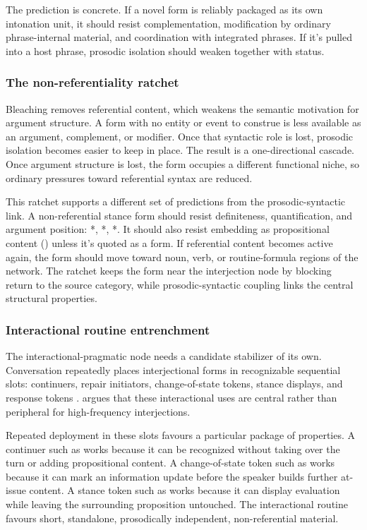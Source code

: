 \documentclass[12pt]{article}
\begin{document}
The prediction is concrete. If a novel form is reliably
packaged as its own intonation unit, it should resist complementation,
modification by ordinary phrase-internal material, and coordination with
integrated phrases. If it's pulled into a host phrase, prosodic isolation should
weaken together with  status.

\subsubsection{The non-referentiality ratchet}

Bleaching removes referential content, which weakens the semantic
motivation for argument structure. A form with no entity or event to
construe is less available as an argument, complement, or modifier. Once
that syntactic role is lost, prosodic isolation becomes easier to keep
in place. The result is a one-directional cascade. Once argument
structure is lost, the form occupies a different functional niche, so
ordinary pressures toward referential syntax are reduced.

This ratchet supports a different set of predictions from the
prosodic-syntactic link. A non-referential stance form should resist
definiteness, quantification, and argument position:
*, *, *. It should also resist embedding as propositional content
() unless it's quoted as a form. If
referential content becomes active again, the form should move toward
noun, verb, or routine-formula regions of the network. The ratchet
keeps the form near the interjection node by blocking return
to the source category, while prosodic-syntactic coupling links the
central structural properties.

\subsubsection{Interactional routine entrenchment}

The interactional-pragmatic node needs a candidate stabilizer of its own.
Conversation repeatedly places interjectional forms in recognizable
sequential slots: continuers, repair initiators, change-of-state tokens,
stance displays, and response tokens \citep{stivers2019,dingemanse2020}.
\textcite{dingemanse2024} argues that these interactional uses are
central rather than peripheral for high-frequency interjections.

Repeated deployment in these slots favours a particular package of
properties. A continuer such as  works because it can be
recognized without taking over the turn or adding propositional content.
A change-of-state token such as  works because it can mark
an information update before the speaker builds further at-issue
content. A stance token such as  works because it can
display evaluation while leaving the surrounding proposition untouched.
The interactional routine favours short, standalone,
prosodically independent, non-referential material.
\end{document}
